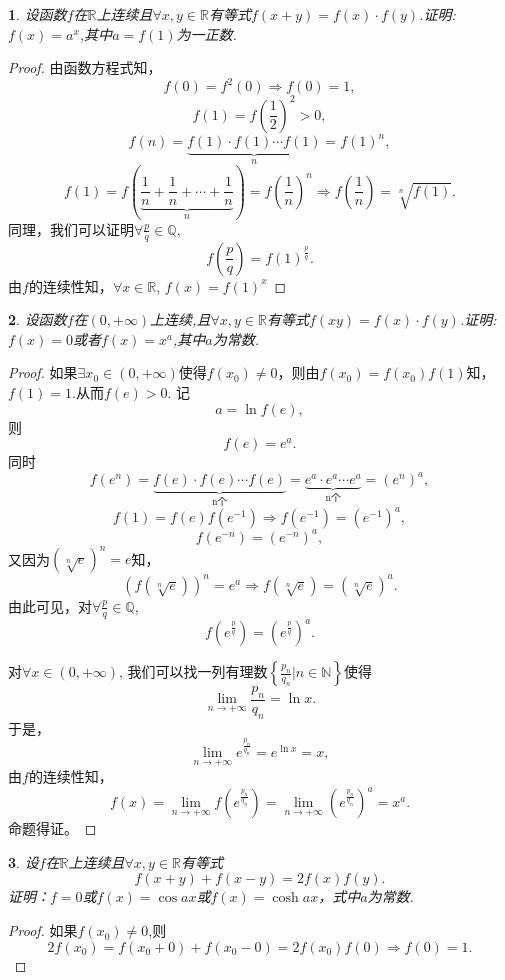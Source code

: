 \documentclass[utf8]{book}
\newtheorem{example}{}[section]             %
\begin{document}
\begin{example}
设函数$f$在$\mathbb{R}$上连续且$\forall x, y\in\mathbb{R}$有等式$f(x+y)=f(x)\cdot f(y)$.证明:$f(x)=a^x$,其中$a=f(1)$为一正数.
\end{example}
\begin{proof}
由函数方程式知，
$$f(0) = f^2(0)\Rightarrow f(0) = 1,$$
$$f(1) = f\left(\frac{1}{2}\right)^2 > 0,$$
$$f(n) = \underbrace{f(1)\cdot f(1)\cdots f(1)}_{n}=f(1)^n,$$
$$f(1) = f\left(\underbrace{\frac{1}{n}+\frac{1}{n}+\cdots+\frac{1}{n}}_{n}\right)=f\left(\frac{1}{n}\right)^n\Rightarrow f\left(\frac{1}{n}\right)=\sqrt[n]{f(1)}.$$
同理，我们可以证明$\forall \frac{p}{q}\in\mathbb{Q}$, 
$$f\left(\frac{p}{q}\right)=f(1)^{\frac{p}{q}}.$$
由$f$的连续性知，$\forall x\in\mathbb{R}$, $f(x) = f(1)^x$
\end{proof}
\begin{example}
设函数$f$在$(0, +\infty)$上连续,且$\forall x, y\in\mathbb{R}$有等式$f(xy)=f(x)\cdot f(y)$.证明:$f(x)=0$或者$f(x)=x^a$,其中$a$为常数.
\end{example}
\begin{proof}如果$\exists x_0 \in (0, +\infty)$使得$f(x_0)\neq 0$，则由$f(x_0) =f(x_0)f(1)$知，$f(1) = 1$.从而$f(e) > 0$. 记
$$a=\ln{f(e)},$$ 则$$f(e) = e^a.$$
同时
$$f(e^n)=\underbrace{f(e)\cdot f(e)\cdots f(e)}_{\text{n个}}=\underbrace{e^a\cdot e^a\cdots e^a}_{\text{n个}}=(e^n)^a,$$
$$f(1)=f(e)f(e^{-1})\Rightarrow f(e^{-1}) = (e^{-1})^a,$$
$$f(e^{-n}) = (e^{-n})^a,$$
又因为$(\sqrt[n]{e})^n = e$知，
$$\left(f(\sqrt[n]{e})\right)^n = e^a\Rightarrow f(\sqrt[n]{e})=(\sqrt[n]{e})^a.$$
由此可见，对$\forall \frac{p}{q}\in\mathbb{Q}$, 
$$f(e^{\frac{p}{q}})=\left(e^{\frac{p}{q}}\right)^a.$$

对$\forall x\in(0,+\infty)$, 我们可以找一列有理数$\left\{\frac{p_n}{q_n}\bigg| n\in\mathbb{N}\right\}$使得
$$\displaystyle\lim_{n\to +\infty}\frac{p_n}{q_n}=\ln{x}.$$
于是，
$$\displaystyle\lim_{n\to +\infty}e^{\frac{p_n}{q_n}}=e^{\ln{x}} = x,$$
由$f$的连续性知，
$$f(x)=\displaystyle\lim_{n\to +\infty}f\left(e^{\frac{p_n}{q_n}}\right)=\displaystyle\lim_{n\to +\infty}\left(e^{\frac{p_n}{q_n}}\right)^a=x^a.$$
命题得证。
\end{proof}
\begin{example}
设$f$在$\mathbb{R}$上连续且$\forall x, y\in\mathbb{R}$有等式
$$f(x+y)+f(x-y)=2f(x)f(y).$$证明：$f=0$或$f(x)=\cos{ax}$或$f(x)=\cosh{ax}$，式中$a$为常数.
\end{example}
\begin{proof}
如果$f(x_0)\neq 0$,则 $$2f(x_0)=f(x_0+0)+f(x_0-0)=2f(x_0)f(0)\Rightarrow f(0)=1.$$
\end{proof}
\end{document}
